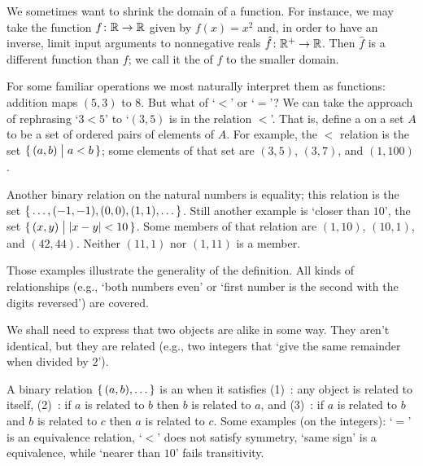 We sometimes want to shrink the domain of a function.
For instance, we may take the function \( \mbox{$f\colon \mathbb{R}\to \mathbb{R}$} \) given by
\( f(x)=x^2 \) and, in order to have an inverse, limit input arguments to
nonnegative reals \( \mbox{$\hat{f}\colon \mathbb{R}^+\to \mathbb{R}$} \).
Then \( \hat{f} \) is a different function than \( f \); we call it
the  of
\( f \) to the smaller domain.








For some familiar operations we most naturally interpret them as functions:
addition maps \( (5,3) \) to \( 8 \).
But what of `\( < \)' or `\( = \)'?
We can take the approach of rephrasing `\( 3<5 \)' to `\( (3,5) \) is
in the relation \( < \)'.
That is, define a  on a set \( A \) to be
a set of ordered pairs of elements of \( A \).
For example, the \( < \) relation is the set
\(  \mbox{$\{\,(a,b)\bigm| a<b\,\}$} \); some elements of that set are
\( (3,5) \), \( (3,7) \), and \( (1,100) \).

Another binary relation on the natural numbers is equality; this relation is
the set
\( \mbox{$\{\,\ldots,(-1,-1),(0,0),(1,1),\ldots\,\}$} \).
Still another example is `closer than \( 10 \)', the set
\( \mbox{$\{\,(x,y)\bigm| |x-y|<10 \,\}$} \).
Some members of that relation are \( (1,10) \), \( (10,1) \),
and \( (42,44) \).
Neither \( (11,1) \) nor \( (1,11) \) is a member.

Those examples illustrate the generality of the definition.
All kinds of relationships (e.g., `both numbers
even' or `first number is the second with the digits reversed')
are covered.




We shall need to express that two objects are alike in some way.
They aren't identical, but they are related
(e.g., two integers that `give the same remainder when divided by \( 2 \)').

A binary relation \( \mbox{$\{\,(a,b),\ldots \,\}$} \)
is an 
when it satisfies
(1)~: 
     any object is related to itself,
(2)~: 
     if \( a \) is related to \( b \) then
     \( b \) is related to \( a \), and
(3)~:
     if \( a \) is related to \( b \) and \( b \) is
     related to \( c \) then \( a \) is related to \( c \).
Some examples (on the integers): `\( = \)' is an equivalence relation,
`\( < \)' does not satisfy symmetry,
`same sign' is a equivalence, while `nearer than \( 10 \)' fails transitivity.






